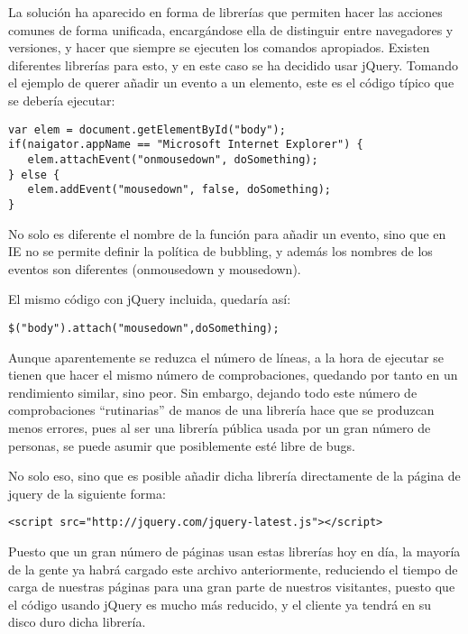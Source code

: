La solución ha aparecido en forma de librerías que permiten hacer las acciones comunes de forma unificada, encargándose ella de distinguir entre navegadores y versiones, y hacer que siempre se ejecuten los comandos apropiados. Existen diferentes librerías para esto, y en este caso se ha decidido usar jQuery. Tomando el ejemplo de querer añadir un evento a un elemento, este es el código típico que se debería ejecutar:

\begin{verbatim}
var elem = document.getElementById("body");
if(naigator.appName == "Microsoft Internet Explorer") {
   elem.attachEvent("onmousedown", doSomething);
} else {
   elem.addEvent("mousedown", false, doSomething);
}
\end{verbatim}

No solo es diferente el nombre de la función para añadir un evento, sino que en IE no se permite definir la política de bubbling, y además los nombres de los eventos son diferentes (onmousedown y mousedown).

El mismo código con jQuery incluida, quedaría así:

\begin{verbatim}
$("body").attach("mousedown",doSomething);
\end{verbatim}

Aunque aparentemente se reduzca el número de líneas, a la hora de ejecutar se tienen que hacer el mismo número de comprobaciones, quedando por tanto en un rendimiento similar, sino peor. Sin embargo, dejando todo este número de comprobaciones ``rutinarias'' de manos de una librería hace que se produzcan menos errores, pues al ser una librería pública usada por un gran número de personas, se puede asumir que posiblemente esté libre de bugs.

No solo eso, sino que es posible añadir dicha librería directamente de la página de jquery de la siguiente forma:

\begin{verbatim}
<script src="http://jquery.com/jquery-latest.js"></script>
\end{verbatim}

Puesto que un gran número de páginas usan estas librerías hoy en día, la mayoría de la gente ya habrá cargado este archivo anteriormente, reduciendo el tiempo de carga de nuestras páginas para una gran parte de nuestros visitantes, puesto que el código usando jQuery es mucho más reducido, y el cliente ya tendrá en su disco duro dicha librería.

